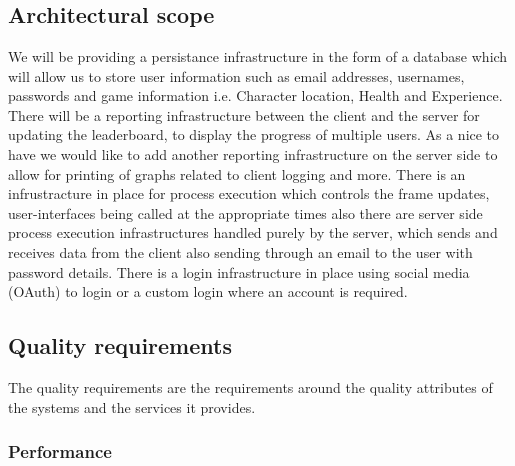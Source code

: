 \documentclass[letterpaper]{article}
\begin{document}
	\newpage
		
		\section*{\colorbox{blue}{}} 
		\vspace{0.1in}
			
			\subsection*{ Architectural scope }
			\vspace{0.1in}	
			We will be providing a persistance infrastructure in the form of a database which will allow us to store user information such as email addresses, usernames, passwords and game information i.e. Character location, Health and Experience. There will be a reporting infrastructure between the client and the server for updating the leaderboard, to display the progress of multiple users. As a nice to have we would like to add another reporting infrastructure on the server side to allow for printing of graphs related to client logging and more. There is an infrustracture in place for process execution which controls the frame updates, user-interfaces being called at the appropriate times also there are server side process execution infrastructures handled purely by the server, which sends and receives data from the client also sending through an email to the user with password details. There is a login infrastructure in place using social media (OAuth) to login or a custom login where an account is required. 
				
			\vspace{0.2in}
			\subsection*{ Quality requirements }
			\vspace{0.1in}
				
				The quality requirements are the requirements around the quality attributes of the systems and the
				services it provides.
				
				\subsubsection*{Performance}
				\vspace{0.1in}
				
\end{document}

